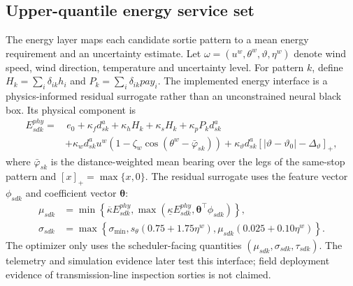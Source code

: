 \subsection{Upper-quantile energy service set}
\label{sec:model-energy}

The energy layer maps each candidate sortie pattern to a mean energy requirement and an uncertainty estimate. Let \(\omega=(u^w,\theta^w,\vartheta,\eta^w)\) denote wind speed, wind direction, temperature and uncertainty level. For pattern \(k\), define \(H_k=\sum_i\delta_{ik}h_i\) and \(P_k=\sum_i\delta_{ik}pay_i\). The implemented energy interface is a physics-informed residual surrogate rather than an unconstrained neural black box. Its physical component is
\begin{align}
E^{phy}_{sdk}=&\,e_0+\kappa_f d^a_{sk}+\kappa_h H_k+\kappa_s H_k
+\kappa_p P_k d^a_{sk} \nonumber\\
&+\kappa_w d^a_{sk}u^w\left(1-\zeta_w\cos(\theta^w-\bar\varphi_{sk})\right)
+\kappa_\vartheta d^a_{sk}\left[|\vartheta-\vartheta_0|-\Delta_\vartheta\right]_+,
\label{eq:sb-energy-physics}
\end{align}
where \(\bar\varphi_{sk}\) is the distance-weighted mean bearing over the legs of the same-stop pattern and \([x]_+=\max\{x,0\}\). The residual surrogate uses the feature vector \(\phi_{sdk}\) and coefficient vector \(\boldsymbol\theta\):
\begin{align}
\mu_{sdk} &=
\min\left\{\overline\kappa E^{phy}_{sdk},
\max\left(\underline\kappa E^{phy}_{sdk},\boldsymbol\theta^\top\phi_{sdk}\right)\right\},
\label{eq:sb-energy-mean}\\
\sigma_{sdk} &=
\max\left\{\sigma_{\min},
s_\theta(0.75+1.75\eta^w),
\mu_{sdk}(0.025+0.10\eta^w)\right\}.
\label{eq:surrogate}
\end{align}
The optimizer only uses the scheduler-facing quantities \((\mu_{sdk},\sigma_{sdk},\tau_{sdk})\). The telemetry and simulation evidence later test this interface; field deployment evidence of transmission-line inspection sorties is not claimed.

